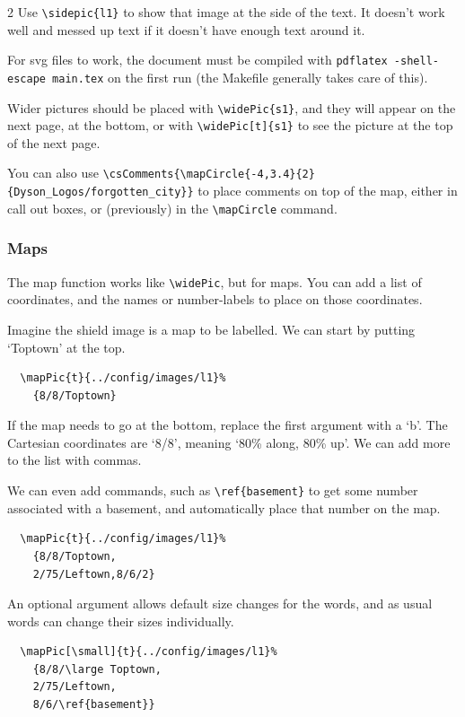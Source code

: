 \documentclass[a4paper,openany]{book}
\begin{document}
\begin{multicols}{2}
Use \verb"\sidepic{l1}" to show that image at the side of the text.
It doesn't work well and messed up text if it doesn't have enough text around it.


For svg files to work, the document must be compiled with \verb"pdflatex -shell-escape main.tex" on the first run (the Makefile generally takes care of this).

Wider pictures should be placed with \verb"\widePic{s1}", and they will appear on the next page, at the bottom, or with \verb"\widePic[t]{s1}" to see the picture at the top of the next page.


You can also use \verb"\csComments{\mapCircle{-4,3.4}{2}{Dyson_Logos/forgotten_city}}" to place comments on top of the map, either in call out boxes, or (previously) in the \verb"\mapCircle" command.

\subsubsection{Maps}

The map function works like \verb"\widePic", but for maps.
You can add a list of coordinates, and the names or number-labels to place on those coordinates.


Imagine the shield image is a map to be labelled.
We can start by putting `Toptown' at the top.

\begin{verbatim}
  \mapPic{t}{../config/images/l1}%
    {8/8/Toptown}
\end{verbatim}

If the map needs to go at the bottom, replace the first argument with a `b'.
The Cartesian coordinates are `8/8', meaning `80\% along, 80\% up'.
We can add more to the list with commas.

We can even add commands, such as \verb"\ref{basement}" to get some number associated with a basement, and automatically place that number on the map.

\begin{verbatim}
  \mapPic{t}{../config/images/l1}%
    {8/8/Toptown,
    2/75/Leftown,8/6/2}
\end{verbatim}

An optional argument allows default size changes for the words, and as usual words can change their sizes individually.

\begin{verbatim}
  \mapPic[\small]{t}{../config/images/l1}%
    {8/8/\large Toptown,
    2/75/Leftown,
    8/6/\ref{basement}}
\end{verbatim}

\end{multicols}
\end{document}
